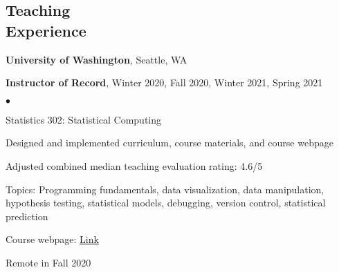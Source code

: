 \documentclass[margin,centered]{res}
\newenvironment{list1}{
  \begin{list}{\ding{113}}{%
      \setlength{\itemsep}{0in}
      \setlength{\parsep}{0in} \setlength{\parskip}{0in}
      \setlength{\topsep}{0in} \setlength{\partopsep}{0in}
      \setlength{\leftmargin}{0.17in}}}{\end{list}}
\newenvironment{list2}{
  \begin{list}{$\bullet$}{%
      \setlength{\itemsep}{0in}
      \setlength{\parsep}{0in} \setlength{\parskip}{0in}
      \setlength{\topsep}{0in} \setlength{\partopsep}{0in}
      \setlength{\leftmargin}{0.2in}}}{\end{list}}
\begin{document}
\begin{resume}
\begin{comment}
{\bf MN2020}, St. Paul, Minnesota
\begin{list1}
\item[] 
Education Research Fellow, January 2013--February 2013
\begin{list2}
\vspace*{.05in}
\item Analyzed local, state, and national education policy through the lens of racial and socioeconomic equity
\item Composed reports evaluating current policy and advocating for policy change
\item Published policy reports to various social media outlets with over 47,000 subscribers
\item Gathered and cleaned data for project to evaluate charter school funding and outcomes
\end{list2}
\end{list1}
\end{comment}

\section{\sc Teaching \\ Experience}

{\bf University of Washington}, Seattle, WA
\begin{list1}
\item[] \textbf{Instructor of Record}, Winter 2020, Fall 2020, Winter 2021, Spring 2021
\begin{list2}
\vspace*{.05in}
\item Statistics 302: Statistical Computing
\item Designed and implemented curriculum, course materials, and course webpage
\item Adjusted combined median teaching evaluation rating: 4.6/5
\item Topics: Programming fundamentals, data visualization, data manipulation, hypothesis testing, statistical models, debugging, version control, statistical prediction
\item Course webpage: \href{https://bryandmartin.github.io/STAT302}{Link}
\item Remote in Fall 2020
\end{list2}
\end{list1}


\end{resume}
\end{document}
